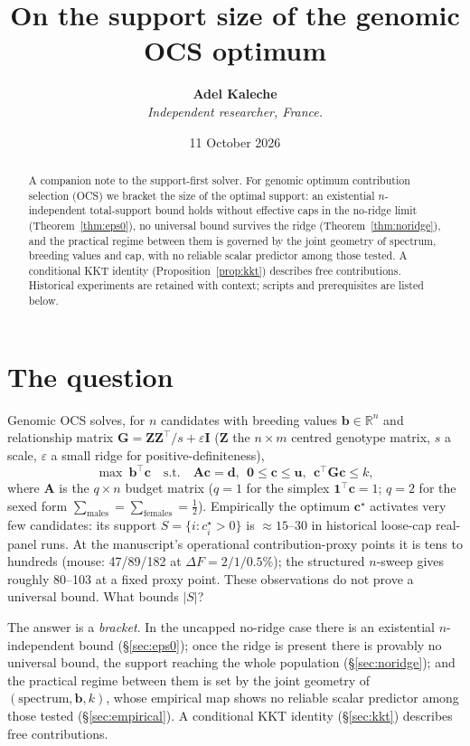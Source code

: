 \documentclass[11pt]{article}
\title{\bfseries On the support size of the genomic OCS optimum}
\author{\textbf{Adel Kaleche}\\[2pt] \small\itshape Independent researcher, France.}
\date{11 October 2026}
\theoremstyle{plain}
\newcommand{\tp}{^{\top}}
\newcommand{\bc}{\mathbf{c}}
\newcommand{\bb}{\mathbf{b}}
\newcommand{\bG}{\mathbf{G}}
\newcommand{\bZ}{\mathbf{Z}}
\newcommand{\bA}{\mathbf{A}}
\newcommand{\bd}{\mathbf{d}}
\newcommand{\bu}{\mathbf{u}}
\newcommand{\bone}{\mathbf{1}}
\begin{document}
\maketitle

\begin{abstract}
\noindent
A companion note to the support-first solver. For genomic optimum contribution selection
(OCS) we bracket the size of the optimal support: an existential $n$-independent total-support bound holds without effective caps in the
no-ridge limit (Theorem~\ref{thm:eps0}), no universal bound survives the ridge
(Theorem~\ref{thm:noridge}), and the practical regime between them is governed by the joint
geometry of spectrum, breeding values and cap, with no reliable scalar predictor among those tested. A conditional KKT identity
(Proposition~\ref{prop:kkt}) describes free contributions. Historical experiments are retained with context; scripts and prerequisites are listed below.
\end{abstract}

\section{The question}

Genomic OCS solves, for $n$ candidates with breeding values $\bb \in \mathbb{R}^n$ and
relationship matrix $\bG = \bZ\bZ\tp/s + \varepsilon\mathbf{I}$ ($\bZ$ the $n\times m$ centred
genotype matrix, $s$ a scale, $\varepsilon$ a small ridge for positive-definiteness),
\begin{equation}\label{eq:ocs}
  \max\ \bb\tp\bc \quad\text{s.t.}\quad \bA\bc = \bd,\ \ \mathbf{0} \le \bc \le \bu,\ \ \bc\tp\bG\bc \le k,
\end{equation}
where $\bA$ is the $q\times n$ budget matrix ($q=1$ for the simplex $\bone\tp\bc=1$; $q=2$ for
the sexed form $\sum_{\text{males}} = \sum_{\text{females}} = \tfrac12$). Empirically the
optimum $\bc^\star$ activates very few candidates: its support $S = \{i : c^\star_i > 0\}$ is
$\approx15$--$30$ in historical loose-cap real-panel runs. At the manuscript's operational contribution-proxy points it is tens to hundreds (mouse: 47/89/182 at $\Delta F=2/1/0.5\%$); the structured $n$-sweep gives roughly 80--103 at a fixed proxy point. These observations do not prove a universal bound. What bounds
$|S|$?

The answer is a \emph{bracket}. In the uncapped no-ridge case there is an existential $n$-independent bound
(\S\ref{sec:eps0}); once the ridge is present there is provably no universal bound, the
support reaching the whole population (\S\ref{sec:noridge}); and the practical regime between
them is set by the joint geometry of $(\text{spectrum}, \bb, k)$, whose empirical map shows no reliable scalar predictor among those tested (\S\ref{sec:empirical}). A conditional KKT identity
(\S\ref{sec:kkt}) describes free contributions.
\end{document}
